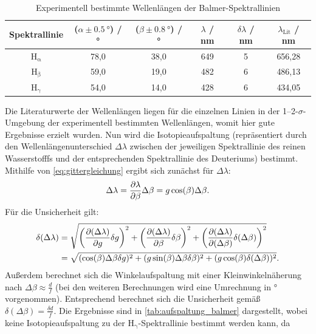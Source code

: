 \begin{table}[H]
    \centering
    \caption{Experimentell bestimmte Wellenlängen der Balmer-Spektrallinien}
    \begin{tabular}{c|c|c|c|c|c}
        Spektrallinie & ($\alpha \pm \SI{0,5}{\degree}$) / \unit{\degree} & ($\beta \pm \SI{0,8}{\degree}$) / \unit{\degree} & $\lambda$ / \unit{\nano \meter} & $\delta \lambda$ / \unit{\nano \meter} & $\lambda_{\mathrm{Lit}}$ / \unit{\nano \meter} \\
        \hline
        $\mathrm{H_{\alpha}}$ & 78,0 & 38,0 & 649 & 5 & 656,28 \\
        $\mathrm{H_{\beta}}$ & 59,0 & 19,0 & 482 & 6 & 486,13 \\
        $\mathrm{H_{\gamma}}$ & 54,0 & 14,0 & 428 & 6 & 434,05
    \end{tabular}\label{tab:wellenlangen_balmer}
\end{table} Die Literaturwerte der Wellenlängen liegen für die einzelnen Linien in der 1--2-$\sigma$-Umgebung der experimentell bestimmten Wellenlängen, womit hier gute Ergebnisse erzielt wurden.\newline
\indent Nun wird die Isotopieaufspaltung (repräsentiert durch den Wellenlängenunterschied $\Delta \lambda$ zwischen der jeweiligen Spektrallinie des reinen Wasserstofffs und der entsprechenden
Spektrallinie des Deuteriums) bestimmt. Mithilfe von \cref{eq:gittergleichung} ergibt sich zunächst für $\Delta \lambda$:
\begin{equation}\label{eq:isotopieaufspaltung}
    \Delta \lambda = \pdv{\lambda}{\beta} \Delta \beta = g \cos(\beta) \Delta \beta .
\end{equation} Für die Unsicherheit gilt:
\begin{align*}
    \delta (\Delta \lambda) &= \sqrt{\left(\pdv{(\Delta \lambda)}{g} \delta g\right)^2 + \left(\pdv{(\Delta \lambda)}{\beta} \delta \beta\right)^2 + \left(\pdv{(\Delta \lambda)}{(\Delta \beta)} \delta (\Delta \beta)\right)^2} \\
    &= \sqrt{(\cos(\beta) \Delta \beta \delta g)^2 + (g \sin(\beta) \Delta \beta \delta \beta)^2 + (g \cos(\beta) \delta (\Delta \beta))^2} .
\end{align*} Außerdem berechnet sich die Winkelaufspaltung mit einer Kleinwinkelnäherung nach $\Delta \beta \approx \frac{d}{f}$ (bei den weiteren Berechnungen wird
eine Umrechnung in \unit{\degree} vorgenommen). Entsprechend berechnet sich die Unsicherheit gemäß $\delta (\Delta \beta) = \frac{\delta d}{f}$. Die Ergebnisse
sind in \cref{tab:aufspaltung_balmer} dargestellt, wobei keine Isotopieaufspaltung zu der $\mathrm{H_{\mathrm{\gamma}}}$-Spektrallinie bestimmt werden kann, da

